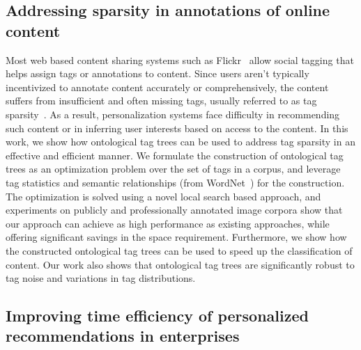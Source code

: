 \documentclass[12pt]{ucsddissertation}
\begin{document}

\subsection{Addressing sparsity in annotations of online content}

Most web based content sharing systems such as Flickr~\cite{Flickr} allow social tagging that helps assign tags or annotations to content. Since users aren't typically incentivized to annotate content accurately or comprehensively, the content suffers from insufficient and often missing tags, usually referred to as tag sparsity~\cite{SunLang11,MohdSemantic13}. 
As a result, personalization systems face difficulty in recommending such content or in inferring user interests based on access to the content. 
In this work, we show how ontological tag trees can be used to address tag sparsity in an effective and efficient manner. 
We formulate the construction of ontological tag trees as an optimization problem over the set of tags in a corpus, and leverage tag statistics and semantic relationships (from WordNet~\cite{wordnet}) for the construction. The optimization is solved using a novel local search based approach, and experiments on publicly and professionally annotated image corpora show that our approach can achieve as high performance as existing approaches, while offering significant savings in the space requirement. Furthermore, we show how the constructed ontological tag trees can be used to speed up the classification of content. Our work also shows that ontological tag trees are significantly robust to tag noise and variations in tag distributions. 


\subsection{Improving time efficiency of personalized recommendations in enterprises}
\end{document}
